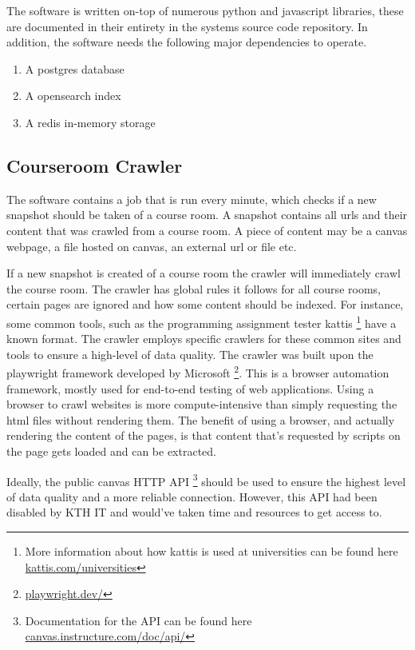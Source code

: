 The software is written on-top of numerous python and javascript libraries, these are documented in their entirety in the systems source code repository. In addition, the software needs the following major dependencies to operate.


\begin{enumerate}
        \item A postgres database
        \item A opensearch index
        \item A redis in-memory storage
\end{enumerate}


\subsection{Courseroom Crawler}


The software contains a job that is run every minute, which checks if a new snapshot should be taken of a course room. A snapshot contains all urls and their content that was crawled from a course room. A piece of content may be a canvas webpage, a file hosted on canvas, an external url or file etc.


If a new snapshot is created of a course room the crawler will immediately crawl the course room. The crawler has global rules it follows for all course rooms, certain pages are ignored and how some content should be indexed. For instance, some common tools, such as the programming assignment tester kattis \footnote{More information about how kattis is used at universities can be found here \href{https://www.kattis.com/universities}{kattis.com/universities}} have a known format. The crawler employs specific crawlers for these common sites and tools to ensure a high-level of data quality.
The crawler was built upon the playwright framework developed by Microsoft \footnote{\href{https://playwright.dev/}{playwright.dev/}}. This is a browser automation framework, mostly used for end-to-end testing of web applications. Using a browser to crawl websites is more compute-intensive than simply requesting the html files without rendering them. The benefit of using a browser, and actually rendering the content of the pages, is that content that’s requested by scripts on the page gets loaded and can be extracted.


Ideally, the public canvas HTTP API \footnote{Documentation for the API can be found here \href{https://canvas.instructure.com/doc/api/}{canvas.instructure.com/doc/api/}} should be used to ensure the highest level of data quality and a more reliable connection. However, this API had been disabled by KTH IT and would’ve taken time and resources to get access to.


